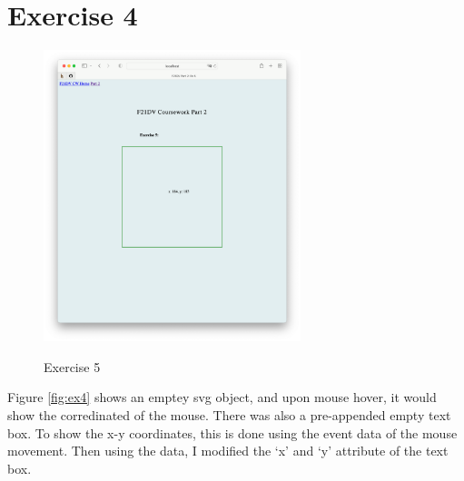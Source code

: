 \documentclass{scrreprt}
\begin{document}
\section{Exercise 4}
\begin{figure}[!ht]
    \centering
    \includegraphics[width = 7.5cm]{images/ex5.png}
    \label{fig:ex5}
    \caption{Exercise 5}
\end{figure}
\FloatBarrier
% 
Figure \ref{fig:ex4} shows an emptey svg object, and upon mouse hover, it would show the corredinated of the mouse. There was also a pre-appended empty text box. To show the x-y coordinates, this is done using the event data of the mouse movement. Then using the data, I modified the `x' and `y' attribute of the text box.
\end{document}
